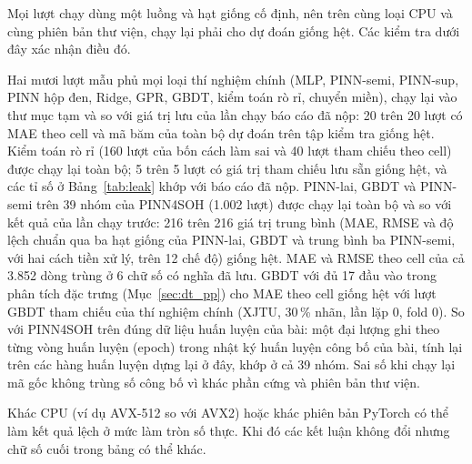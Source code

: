 Mọi lượt chạy dùng một luồng và hạt giống cố định, nên trên cùng loại CPU và cùng phiên bản thư viện, chạy lại phải cho dự đoán giống hệt. Các kiểm tra dưới đây xác nhận điều đó.

Hai mươi lượt mẫu phủ mọi loại thí nghiệm chính (MLP, PINN-semi, PINN-sup, PINN hộp đen, Ridge, GPR, GBDT, kiểm toán rò rỉ, chuyển miền), chạy lại vào thư mục tạm và so với giá trị lưu của lần chạy báo cáo đã nộp: 20 trên 20 lượt có MAE theo cell và mã băm của toàn bộ dự đoán trên tập kiểm tra giống hệt. Kiểm toán rò rỉ (160 lượt của bốn cách làm sai và 40 lượt tham chiếu theo cell) được chạy lại toàn bộ; 5 trên 5 lượt có giá trị tham chiếu lưu sẵn giống hệt, và các tỉ số ở Bảng~\ref{tab:leak} khớp với báo cáo đã nộp. PINN-lai, GBDT và PINN-semi trên 39 nhóm của PINN4SOH (1.002 lượt) được chạy lại toàn bộ và so với kết quả của lần chạy trước: 216 trên 216 giá trị trung bình (MAE, RMSE và độ lệch chuẩn qua ba hạt giống của PINN-lai, GBDT và trung bình ba PINN-semi, với hai cách tiền xử lý, trên 12 chế độ) giống hệt. MAE và RMSE theo cell của cả 3.852 dòng trùng ở 6 chữ số có nghĩa đã lưu. GBDT với đủ 17 đầu vào trong phân tích đặc trưng (Mục~\ref{sec:dt_pp}) cho MAE theo cell giống hệt với lượt GBDT tham chiếu của thí nghiệm chính (XJTU, 30\,\% nhãn, lần lặp 0, fold 0). So với PINN4SOH trên đúng dữ liệu huấn luyện của bài: một đại lượng ghi theo từng vòng huấn luyện (epoch) trong nhật ký huấn luyện công bố của bài, tính lại trên các hàng huấn luyện dựng lại ở đây, khớp ở cả 39 nhóm. Sai số khi chạy lại mã gốc không trùng số công bố vì khác phần cứng và phiên bản thư viện.

Khác CPU (ví dụ AVX-512 so với AVX2) hoặc khác phiên bản PyTorch có thể làm kết quả lệch ở mức làm tròn số thực. Khi đó các kết luận không đổi nhưng chữ số cuối trong bảng có thể khác.
